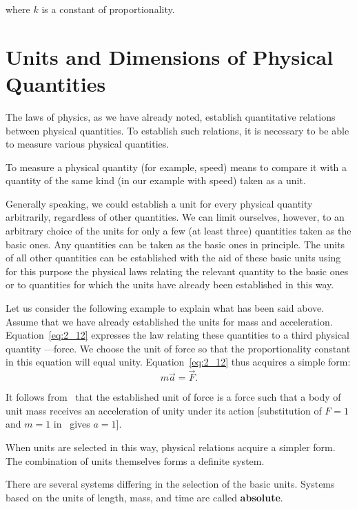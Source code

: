 \noindent
where $k$ is a constant of proportionality.

\section{Units and Dimensions of Physical Quantities}\label{sec:2_5}

The laws of physics, as we have already noted, establish quantitative relations between physical quantities. To establish such relations, it is necessary to be able to measure various physical quantities.

To measure a physical quantity (for example, speed) means to compare it with a quantity of the same kind (in our example with speed) taken as a unit.

Generally speaking, we could establish a unit for every physical quantity arbitrarily, regardless of other quantities. We can limit ourselves, however, to an arbitrary choice of the units for only a few (at least three) quantities taken as the basic ones. Any quantities can be taken as the basic ones in principle. The units of all other quantities can be established with the aid of these basic units using for this purpose the physical laws relating the relevant quantity to the basic ones or to quantities for which the units have already been established in this way.

Let us consider the following example to explain what has been said above. Assume that we have already established the units for mass and acceleration. Equation~\eqref{eq:2_12} expresses the law relating these quantities to a third physical quantity ---force. We choose the unit of force so that the proportionality constant in this equation will equal unity. Equation~\eqref{eq:2_12} thus acquires a simple form:
\begin{equation}\label{eq:2_13}
m\vec{a} = \vec{F}.
\end{equation}

\noindent
It follows from~ that the established unit of force is a force such that a body of unit mass receives an acceleration of unity under its action [substitution of $F=1$ and $m=1$ in~ gives $a=1$].

When units are selected in this way, physical relations acquire a simpler form. The combination of units themselves forms a definite system.

There are several systems differing in the selection of the basic units. Systems based on the units of length, mass, and time are called \textbf{absolute}.

